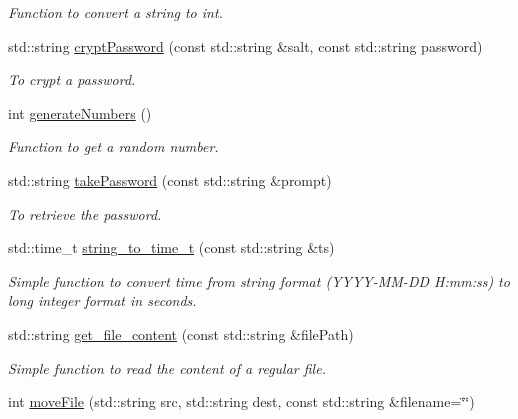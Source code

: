 \begin{DoxyCompactItemize}
\begin{DoxyCompactList}\small\item\em Function to convert a string to int. \item\end{DoxyCompactList}\item 
std::string \hyperlink{namespacevishnu_a6315b6f5e86d48f4c75dc73d08348edf}{cryptPassword} (const std::string \&salt, const std::string password)
\begin{DoxyCompactList}\small\item\em To crypt a password. \item\end{DoxyCompactList}\item 
int \hyperlink{namespacevishnu_a93bc913d891933b4f9d7bc0382f72425}{generateNumbers} ()
\begin{DoxyCompactList}\small\item\em Function to get a random number. \item\end{DoxyCompactList}\item 
std::string \hyperlink{namespacevishnu_a699510f2ba6cb03bd9a6f3696abd9860}{takePassword} (const std::string \&prompt)
\begin{DoxyCompactList}\small\item\em To retrieve the password. \item\end{DoxyCompactList}\item 
std::time\_\-t \hyperlink{namespacevishnu_ace1a774c9d738133e7cdfe505d358764}{string\_\-to\_\-time\_\-t} (const std::string \&ts)
\begin{DoxyCompactList}\small\item\em Simple function to convert time from string format (YYYY-\/MM-\/DD H:mm:ss) to long integer format in seconds. \item\end{DoxyCompactList}\item 
std::string \hyperlink{namespacevishnu_a50b77ca8a04c384cba2b8b6cdec4a26f}{get\_\-file\_\-content} (const std::string \&filePath)
\begin{DoxyCompactList}\small\item\em Simple function to read the content of a regular file. \item\end{DoxyCompactList}\item 
int \hyperlink{namespacevishnu_a66626268c81795efe726f8c9bb70b1c2}{moveFile} (std::string src, std::string dest, const std::string \&filename=\char`\"{}\char`\"{})

\end{DoxyCompactItemize}
